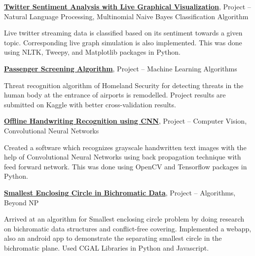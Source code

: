 \documentclass[letterpaper,MMMyyyy,nonstopmode]{simpleresumecv}
\begin{document}
\begin{Body}
\BigGap
\Entry
\href{https://tejasreddy9.github.io/tsa_finalyr/}
{\textbf{Twitter Sentiment Analysis with Live Graphical Visualization}},
Project
\hfill
{} --
\Gap
\BulletItem
Natural Language Processing, Multinomial Naive Bayes Classification Algorithm
\begin{Detail}
\SubBulletItem
Live twitter streaming data is classified based on its sentiment towards a given topic. Corresponding live graph simulation is also implemented.
\SubBulletItem
This was done using NLTK, Tweepy, and Matplotlib packages in Python.
\end{Detail}

\BigGap
\Entry
\href{https://tejasreddy9.github.io/psa_homeland}
{\textbf{Passenger Screening Algorithm}},
Project
\hfill
{} --
\Gap
\BulletItem
Machine Learning Algorithms
\begin{Detail}
\SubBulletItem
Threat recognition algorithm of Homeland Security for detecting threats in the human body at the entrance of airports is remodelled.
\SubBulletItem
Project results are submitted on Kaggle with better cross-validation results.
\end{Detail}

\BigGap
\Entry
\href{https://tejasreddy9.github.io/handwriting_cnn}
{\textbf{Offline Handwriting Recognition using CNN}},
Project
\hfill
{} --
\Gap
\BulletItem
Computer Vision, Convolutional Neural Networks
\begin{Detail}
\SubBulletItem
Created a software which recognizes grayscale handwritten text images with the help of Convolutional Neural Networks using back propagation technique with feed forward network. 
\SubBulletItem
This was done using OpenCV and Tensorflow packages in Python.
\end{Detail}


\newpage

\BigGap
\BigGap
\Entry
\href{https://tejasreddy9.github.io/sec_bichromaticds/}
{\textbf{Smallest Enclosing Circle in Bichromatic Data}},
Project
\hfill
{} --
\Gap
\BulletItem
Algorithms, Beyond NP
\begin{Detail}
\SubBulletItem
Arrived at an algorithm for Smallest enclosing circle problem by doing research on bichromatic data structures and conflict-free covering.
\SubBulletItem
Implemented a webapp, also an android app to demonstrate the separating smallest circle in the bichromatic plane. Used CGAL Libraries in Python and Javascript.
\end{Detail}



\end{Body}
\end{document}
